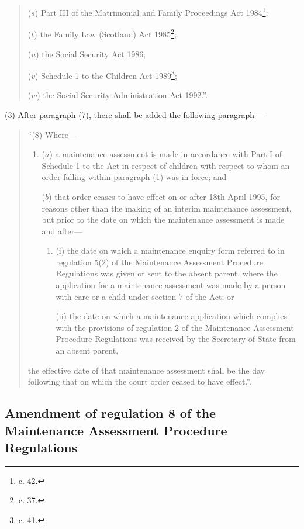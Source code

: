 \documentclass[a4paper]{article}
\begin{document}
\begin{quotation}
\begin{enumerate}
($s$) Part III of the Matrimonial and Family Proceedings Act 1984\footnote{ c. 42.};

($t$) the Family Law (Scotland) Act 1985\footnote{ c. 37.};

($u$) the Social Security Act 1986;

($v$) Schedule 1 to the Children Act 1989\footnote{ c. 41.};

($w$) the Social Security Administration Act 1992.”.
\end{enumerate}
\end{quotation}

(3) After paragraph (7), there shall be added the following paragraph—
\begin{quotation}
“(8) Where—
\begin{enumerate}\item[]
($a$) a maintenance assessment is made in accordance with Part I of Schedule 1 to the Act in respect of children with respect to whom an order falling within paragraph (1) was in force; and

($b$) that order ceases to have effect on or after 18th April 1995, for reasons other than the making of an interim maintenance assessment, but prior to the date on which the maintenance assessment is made and after—
\begin{enumerate}\item[]
(i) the date on which a maintenance enquiry form referred to in regulation 5(2) of the Maintenance Assessment Procedure Regulations was given or sent to the absent parent, where the application for a maintenance assessment was made by a person with care or a child under section 7 of the Act; or

(ii) the date on which a maintenance application which complies with the provisions of regulation 2 of the Maintenance Assessment Procedure Regulations was received by the Secretary of State from an absent parent,
\end{enumerate}
\end{enumerate}
the effective date of that maintenance assessment shall be the day following that on which the court order ceased to have effect.”.
\end{quotation}

\subsection[28. Amendment of regulation 8 of the Maintenance Assessment Procedure Regulations]{\sloppy Amendment of regulation 8 of the Maintenance Assessment Procedure Regulations}
\end{document}
